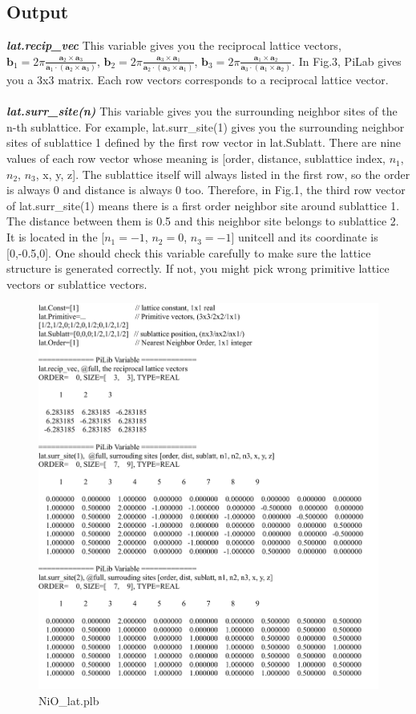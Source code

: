 \documentclass[10pt,a4paper]{article}
\begin{document}
\subsection{Output}
\textit{\textbf{lat.recip\_vec}} This variable gives you the reciprocal lattice vectors, $\textbf{b}_{1}=2\pi \frac{\textbf{a}_{2}\times \textbf{a}_{3}}{\textbf{a}_{1} \cdot (\textbf{a}_{2}\times \textbf{a}_{3})}$, $\textbf{b}_{2}=2\pi \frac{\textbf{a}_{3}\times \textbf{a}_{1}}{\textbf{a}_{2} \cdot (\textbf{a}_{3}\times \textbf{a}_{1})}$, $\textbf{b}_{3}=2\pi \frac{\textbf{a}_{1}\times \textbf{a}_{2}}{\textbf{a}_{3} \cdot (\textbf{a}_{1}\times \textbf{a}_{2})}$. In Fig.3, PiLab gives you a 3x3 matrix. Each row vectors corresponds to a reciprocal lattice vector. \\ \\
\textit{\textbf{lat.surr\_site(n)}} This variable gives you the surrounding neighbor sites of the n-th sublattice. For example, lat.surr\_site(1) gives you the surrounding neighbor sites of sublattice 1 defined by the first row vector in lat.Sublatt. There are nine values of each row vector whose meaning is [order, distance, sublattice index, $n_{1}$, $n_{2}$, $n_{3}$, x, y, z].  The sublattice itself will always listed in the first row, so the order is always 0 and distance is always 0 too. Therefore, in Fig.1, the third row vector of lat.surr\_site(1) means there is a first order neighbor site around sublattice 1. The distance between them is 0.5 and this neighbor site belongs to sublattice 2. It is located in the [$n_{1}=-1$, $n_{2}=0$, $n_{3}=-1$] unitcell and its coordinate is [0,-0.5,0]. One should check this variable carefully to make sure the lattice structure is generated correctly. If not, you might pick wrong primitive lattice vectors or sublattice vectors.

\begin{figure}[tbp]
\centering
\includegraphics[width=1.0\columnwidth]{NiO_lat.pdf}
\caption{NiO\_lat.plb}
\end{figure}
\end{document}
